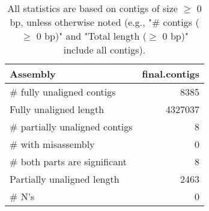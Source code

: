 \documentclass[12pt,a4paper]{article}
\begin{document}
\begin{table}[ht]
\begin{center}
\caption{All statistics are based on contigs of size $\geq$ 0 bp, unless otherwise noted (e.g., "\# contigs ($\geq$ 0 bp)" and "Total length ($\geq$ 0 bp)" include all contigs).}
\begin{tabular}{|l*{1}{|r}|}
\hline
Assembly & final.contigs \\ \hline
\# fully unaligned contigs & 8385 \\ \hline
Fully unaligned length & 4327037 \\ \hline
\# partially unaligned contigs & 8 \\ \hline
\hspace{5mm}\# with misassembly & 0 \\ \hline
\hspace{5mm}\# both parts are significant & 8 \\ \hline
Partially unaligned length & 2463 \\ \hline
\# N's & 0 \\ \hline
\end{tabular}
\end{center}
\end{table}
\end{document}
